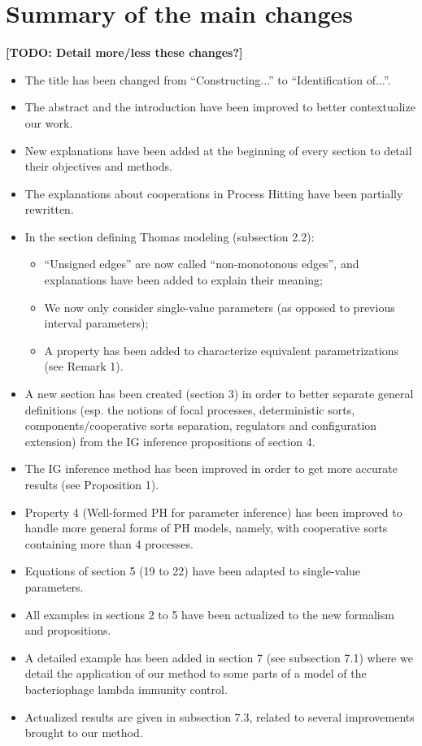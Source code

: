 \documentclass[11pt]{article}
\def\TODO#1{\textbf{[TODO: #1]}}
\begin{document}
\section*{Summary of the main changes}

\TODO{Detail more/less these changes?}

\begin{itemize}
  \item The title has been changed from “Constructing...” to “Identification of...”.
  \item The abstract and the introduction have been improved to better contextualize our work.
  \item New explanations have been added at the beginning of every section
    to detail their objectives and methods.
  \item The explanations about cooperations in Process Hitting have been partially rewritten.
  \item In the section defining Thomas modeling (subsection 2.2):
    \begin{itemize}
      \item “Unsigned edges” are now called “non-monotonous edges”,
        and explanations have been added to explain their meaning;
      \item We now only consider single-value parameters
        (as opposed to previous interval parameters);
      \item A property has been added to characterize equivalent parametrizations
        (see Remark 1).
    \end{itemize}
  \item A new section has been created (section 3)
    in order to better separate general definitions (esp. the notions of focal processes,
    deterministic sorts, components/cooperative sorts separation,
    regulators and configuration extension)
    from the IG inference propositions of section 4.
  \item The IG inference method has been improved in order to get more accurate results
    (see Proposition 1).
  \item Property 4 (Well-formed PH for parameter inference) has been improved
    to handle more general forms of PH models,
    namely, with cooperative sorts containing more than 4 processes.
  \item Equations of section 5 (19 to 22) have been adapted to single-value parameters.
  \item All examples in sections 2 to 5 have been actualized to the new formalism
    and propositions.
  \item A detailed example has been added in section 7 (see subsection 7.1)
    where we detail the application of our method to some parts of a model of
    the bacteriophage lambda immunity control.
  \item Actualized results are given in subsection 7.3,
    related to several improvements brought to our method.
\end{itemize}
\end{document}
